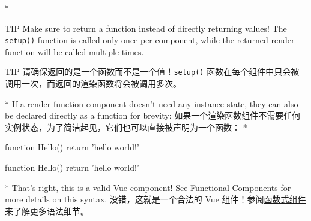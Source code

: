 \begin{paracol}{2}
\switchcolumn[0]*%
\begin{vueQuote}{TIP}
Make sure to return a function instead of directly returning values! The
\texttt{setup()} function is called only once per component, while the
returned render function will be called multiple times.
\end{vueQuote} 
\switchcolumn
\begin{vueQuote}{TIP}
请确保返回的是一个函数而不是一个值！\texttt{setup()}
函数在每个组件中只会被调用一次，而返回的渲染函数将会被调用多次。
\end{vueQuote} 
\switchcolumn[0]*%
If a render function component doesn't need any instance state, they can
also be declared directly as a function for brevity:
\switchcolumn
如果一个渲染函数组件不需要任何实例状态，为了简洁起见，它们也可以直接被声明为一个函数：
\switchcolumn[0]*%
\begin{codeJs}
function Hello() {
  return 'hello world!'
}
\end{codeJs}
\switchcolumn
\begin{codeJs}
function Hello() {
  return 'hello world!'
}
\end{codeJs}
\switchcolumn[0]*%
That's right, this is a valid Vue component! See
\href{https://vuejs.org/guide/extras/render-function.html\#functional-components}{Functional
Components} for more details on this syntax.
\switchcolumn
没错，这就是一个合法的 Vue
组件！参阅\href{https://cn.vuejs.org/guide/extras/render-function.html\#functional-components}{函数式组件}来了解更多语法细节。
\end{paracol}



